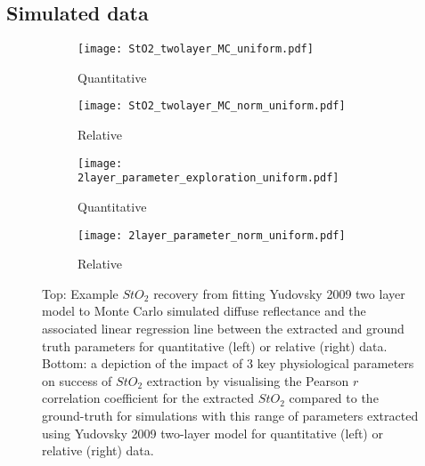 \subsection{Simulated data}
\begin{figure}[htbp]
    \centering
    \begin{subfigure}{0.49\textwidth}
        \texttt{[image: StO2\_twolayer\_MC\_uniform.pdf]}
        \caption{Quantitative}
        \label{fig:egparamsStO2MCu}
    \end{subfigure}
    \begin{subfigure}{0.49\textwidth}
        \texttt{[image: StO2\_twolayer\_MC\_norm\_uniform.pdf]}
        \caption{Relative}
        \label{fig:egparamsStO2MCnormu}
    \end{subfigure}
    \begin{subfigure}{0.49\textwidth}
        \texttt{[image: 2layer\_parameter\_exploration\_uniform.pdf]}
        \caption{Quantitative}
        \label{fig:egparamsfailureMCu}
    \end{subfigure}
    \begin{subfigure}{0.49\textwidth}
        \texttt{[image: 2layer\_parameter\_norm\_uniform.pdf]}
        \caption{Relative}
        \label{fig:egparamsfailureMCnormu}
    \end{subfigure}
    \caption{Top: Example $StO_2$ recovery from fitting Yudovsky 2009 two layer model to Monte Carlo simulated diffuse reflectance and the associated linear regression line between the extracted and ground truth parameters for quantitative (left) or relative (right) data. Bottom: a depiction of the impact of 3 key physiological parameters on success of $StO_2$ extraction by visualising the Pearson $r$ correlation coefficient for the extracted $StO_2$ compared to the ground-truth for simulations with this range of parameters extracted using Yudovsky 2009 two-layer model for quantitative (left) or relative (right) data.}
    \label{fig:MC2layeruniform}
\end{figure}

